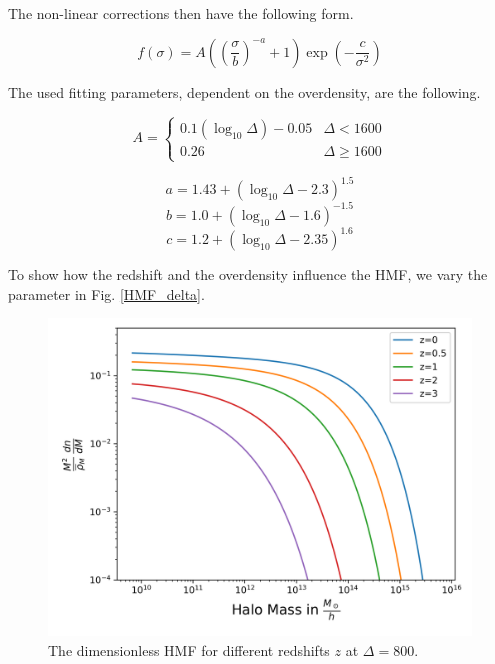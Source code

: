The non-linear corrections then have the following form.

\begin{equation}
    f(\sigma)=A \left( \left(\frac{\sigma}{b}\right)^{-a}+1\right)\exp(-\frac{c}{\sigma^2})
\end{equation}

The used fitting parameters, dependent on the overdensity, are the following.

\[ A = \begin{cases}
    0.1(\log_{10}\Delta)-0.05 & \Delta<1600 \\
    0.26 & \Delta \geq 1600
\end{cases}
\]

\begin{equation}
    a=1.43+(\log_{10}\Delta -2.3)^{1.5}
\end{equation}
\begin{equation}
    b=1.0+(\log_{10}\Delta -1.6)^{-1.5}
\end{equation}
\begin{equation}
    c=1.2+(\log_{10}\Delta -2.35)^{1.6}
\end{equation}

To show how the redshift and the overdensity influence the HMF, we vary the parameter in Fig. \ref{HMF_delta}.

\begin{figure}
    \centering
    \includegraphics[width=0.9\linewidth, clip]{Images/HMF_diff_z.png}
    \caption{The dimensionless HMF for different redshifts $z$ at $\Delta=800$.}
    \label{HMF_z}
\end{figure} 

